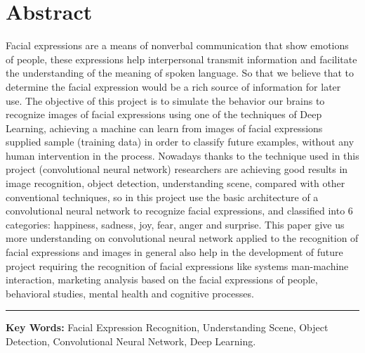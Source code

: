 \chapter*{Abstract}
Facial expressions are a means of nonverbal communication that show emotions of people, these expressions help interpersonal transmit information and facilitate the understanding of the meaning of spoken language. So that we believe that to determine the facial expression would be a rich source of information for later use. The objective of this project is to simulate the behavior our brains to recognize images of facial expressions using one of the techniques of Deep Learning, achieving a machine can learn from images of facial expressions supplied sample (training data) in order to classify future examples, without any human intervention in the process. Nowadays thanks to the technique used in this project (convolutional neural network) researchers are achieving good results in image recognition, object detection, understanding scene, compared with other conventional techniques, so in this project use the basic architecture of a convolutional neural network to recognize facial expressions, and classified into 6 categories: happiness, sadness, joy, fear, anger and surprise. This paper give us more understanding on convolutional neural network applied to the recognition of facial expressions and images in general also help in the development of future project requiring the recognition of facial expressions like systems man-machine interaction, marketing analysis based on the facial expressions of people, behavioral studies, mental health and cognitive processes.
\begin{center}
\noindent\rule{16cm}{0.5pt}
\end{center}
\textbf{Key Words:} Facial Expression Recognition, Understanding Scene, Object Detection, Convolutional Neural Network, Deep Learning.
